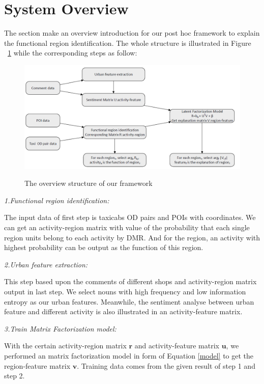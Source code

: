 \documentclass[runningheads]{llncs}
\begin{document}
\section{System Overview}
The section make an overview introduction for our post hoc framework to explain the functional region identification.
The whole structure is illustrated in Figure ~\ref{overview} while the corresponding steps as follow:

\begin{figure}[h]
  \centering
  \includegraphics[scale=0.3]{overview.png}
  \label{overview}
  \caption{The overview structure of our framework}
\end{figure}

\emph{1.Functional region identification:}

The input data of first step is taxicabs OD pairs and POIs with coordinates.
We can get an activity-region matrix with value of the probability that each single region units belong to each activity by DMR.
And for the region, an activity with highest probability can be output as the function of this region.

\emph{2.Urban feature extraction:}

This step based upon the comments of different shops and activity-region matrix output in last step.
We select nouns with high frequency and low information entropy as our urban features.
Meanwhile, the sentiment analyse between urban feature and different activity is also illustrated in an activity-feature matrix.

\emph{3.Train Matrix Factorization model:}

With the certain activity-region matrix $\bm{r}$ and activity-feature matrix $\bm{u}$, we performed an matrix factorization model in form of Equation \ref{model} to get the region-feature matrix $\bm{v}$.
Training data comes from the given result of step 1 and step 2.
\end{document}
